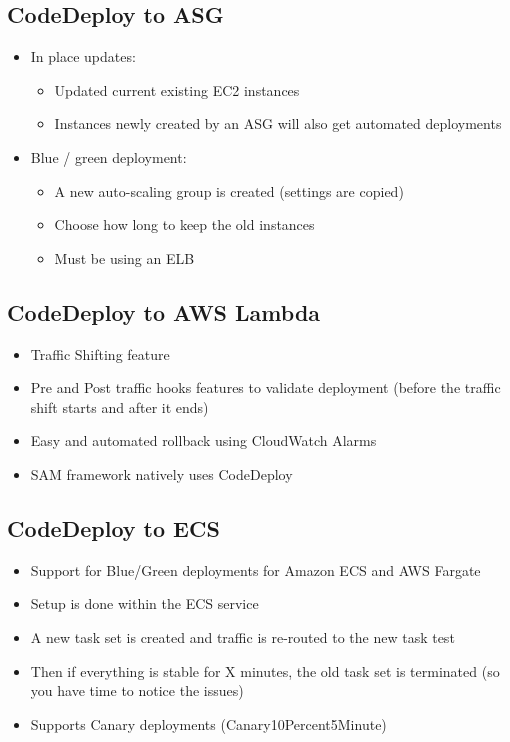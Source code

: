 \subsection{CodeDeploy to ASG}
\begin{itemize}
    \item In place updates:
    \begin{itemize}
        \item Updated current existing EC2 instances
        \item Instances newly created by an ASG will also get automated deployments
    \end{itemize}
    \item Blue / green deployment:
    \begin{itemize}
        \item A new auto-scaling group is created (settings are copied)
        \item Choose how long to keep the old instances
        \item Must be using an ELB
    \end{itemize}
\end{itemize}

\subsection{CodeDeploy to AWS Lambda}
\begin{itemize}
    \item Traffic Shifting feature
    \item Pre and Post traffic hooks features to validate deployment (before the traffic shift starts and after it ends)
    \item Easy and automated rollback using CloudWatch Alarms
    \item SAM framework natively uses CodeDeploy
\end{itemize}

\subsection{CodeDeploy to ECS}
\begin{itemize}
    \item Support for Blue/Green deployments for Amazon ECS and AWS Fargate
    \item Setup is done within the ECS service
    \item A new task set is created and traffic is re-routed to the new task test
    \item Then if everything is stable for X minutes, the old task set is terminated (so you have time to notice the issues)
    \item Supports Canary deployments (Canary10Percent5Minute)
\end{itemize}


